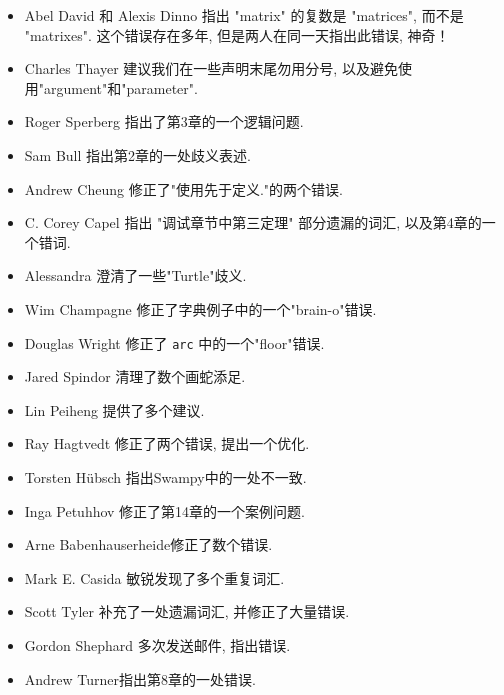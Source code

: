 \documentclass[10pt]{book}
\begin{document}
\begin{itemize}
\item Abel David 和 Alexis Dinno 指出 "matrix" 的复数是 "matrices", 
而不是 "matrixes". 这个错误存在多年, 但是两人在同一天指出此错误, 神奇！

\item Charles Thayer 建议我们在一些声明末尾勿用分号, 以及避免使用"argument"和"parameter". 

\item Roger Sperberg 指出了第3章的一个逻辑问题. 

\item Sam Bull 指出第2章的一处歧义表述. 

\item Andrew Cheung 修正了"使用先于定义."的两个错误.

\item C. Corey Capel 指出 "调试章节中第三定理" 部分遗漏的词汇, 
以及第4章的一个错词. 

\item Alessandra 澄清了一些"Turtle"歧义. 

\item Wim Champagne 修正了字典例子中的一个"brain-o"错误. 

\item Douglas Wright 修正了 {\tt arc} 中的一个"floor"错误. 

\item Jared Spindor 清理了数个画蛇添足. 

\item Lin Peiheng 提供了多个建议. 

\item Ray Hagtvedt 修正了两个错误, 提出一个优化. 

\item Torsten H\"{u}bsch 指出Swampy中的一处不一致. 

\item Inga Petuhhov 修正了第14章的一个案例问题. 

\item Arne Babenhauserheide修正了数个错误. 

\item Mark E. Casida 敏锐发现了多个重复词汇. 

\item Scott Tyler 补充了一处遗漏词汇, 并修正了大量错误. 

\item Gordon Shephard 多次发送邮件, 指出错误. 

\item Andrew Turner指出第8章的一处错误. 


\end{itemize}
\end{document}
